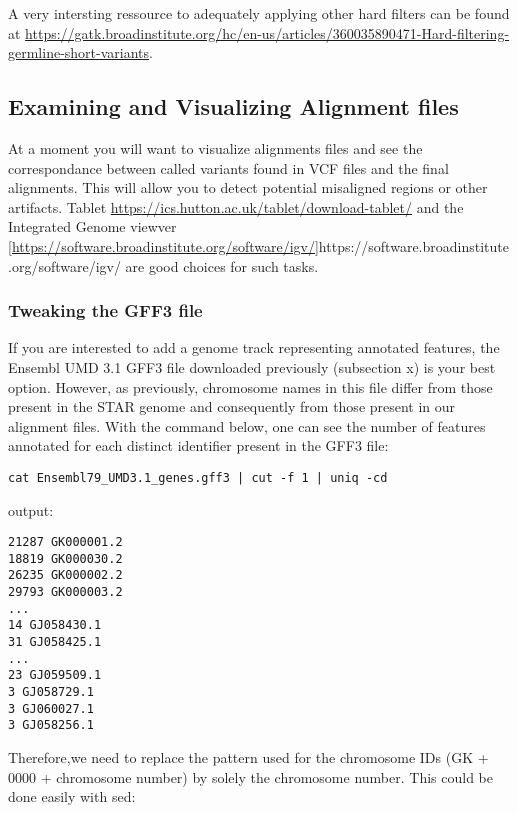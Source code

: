 A very intersting ressource to adequately applying other hard filters can be found at \href{https://gatk.broadinstitute.org/hc/en-us/articles/360035890471-Hard-filtering-germline-short-variants}{https://gatk.broadinstitute.org/hc/en-us/articles/360035890471-Hard-filtering-germline-short-variants}.




\subsection{Examining and Visualizing Alignment files}

At a moment you will want to visualize alignments files and see the correspondance between called variants found in VCF files and the final alignments. This will allow you to detect potential misaligned regions or other artifacts. Tablet \href{https://ics.hutton.ac.uk/tablet/download-tablet/}{https://ics.hutton.ac.uk/tablet/download-tablet/} and the Integrated Genome viewver \ref{https://software.broadinstitute.org/software/igv/}{https://software.broadinstitute.org/software/igv/} are good choices for such tasks.

\subsubsection{Tweaking the GFF3 file}

If you are interested to add a genome track representing annotated features, the Ensembl UMD 3.1 GFF3 file downloaded previously (subsection x) is your best option. However, as previously, chromosome names in this file differ from those present in the STAR genome and consequently from those present in our alignment files. With the command below, one can see the number of features annotated for each distinct identifier present in the GFF3 file:

\begin{verbatim}
cat Ensembl79_UMD3.1_genes.gff3 | cut -f 1 | uniq -cd
\end{verbatim}


\noindent output:
\begin{verbatim}
21287 GK000001.2
18819 GK000030.2
26235 GK000002.2
29793 GK000003.2
...
14 GJ058430.1
31 GJ058425.1
...
23 GJ059509.1
3 GJ058729.1
3 GJ060027.1
3 GJ058256.1
\end{verbatim}

Therefore,we need to replace the pattern used for the chromosome IDs (GK + 0000 + chromosome number) by solely the chromosome number. This could be done easily with sed:


